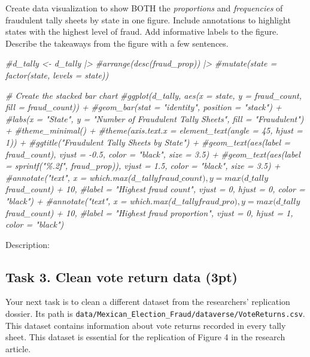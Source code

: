 \documentclass[
]{article}
\newenvironment{Shaded}{\begin{snugshade}}{\end{snugshade}}
\newcommand{\CommentTok}[1]{\textcolor[rgb]{0.56,0.35,0.01}{\textit{#1}}}
\begin{document}
Create data visualization to show BOTH the \emph{proportions} and
\emph{frequencies} of fraudulent tally sheets by state in one figure.
Include annotations to highlight states with the highest level of fraud.
Add informative labels to the figure. Describe the takeaways from the
figure with a few sentences.

\begin{Shaded}
\begin{Highlighting}[]
\CommentTok{\#d\_tally \textless{}{-} d\_tally |\textgreater{}}
  \CommentTok{\#arrange(desc(fraud\_prop)) |\textgreater{}}
  \CommentTok{\#mutate(state = factor(state, levels = state))}

\CommentTok{\# Create the stacked bar chart}
\CommentTok{\#ggplot(d\_tally, aes(x = state, y = fraud\_count, fill = fraud\_count)) +}
  \CommentTok{\#geom\_bar(stat = "identity", position = "stack") +}
  \CommentTok{\#labs(x = "State", y = "Number of Fraudulent Tally Sheets", fill = "Fraudulent") +}
  \CommentTok{\#theme\_minimal() +}
  \CommentTok{\#theme(axis.text.x = element\_text(angle = 45, hjust = 1)) +}
  \CommentTok{\#ggtitle("Fraudulent Tally Sheets by State") +}
  \CommentTok{\#geom\_text(aes(label = fraud\_count), vjust = {-}0.5, color = "black", size = 3.5) +}
  \CommentTok{\#geom\_text(aes(label = sprintf("\%.2f", fraud\_prop)), vjust = 1.5, color = "black", size = 3.5) +}
  \CommentTok{\#annotate("text", x = which.max(d\_tally$fraud\_count), y = max(d\_tally$fraud\_count) + 10, }
           \CommentTok{\#label = "Highest fraud count", vjust = 0, hjust = 0, color = "black") +}
  \CommentTok{\#annotate("text", x = which.max(d\_tally$fraud\_pro), y = max(d\_tally$fraud\_count) + 10, }
           \CommentTok{\#label = "Highest fraud proportion", vjust = 0, hjust = 1, color = "black")}
\end{Highlighting}
\end{Shaded}

Description:

\clearpage

\hypertarget{task-3.-clean-vote-return-data-3pt}{%
\subsection{Task 3. Clean vote return data
(3pt)}\label{task-3.-clean-vote-return-data-3pt}}

Your next task is to clean a different dataset from the researchers'
replication dossier. Its path is
\texttt{data/Mexican\_Election\_Fraud/dataverse/VoteReturns.csv}. This
dataset contains information about vote returns recorded in every tally
sheet. This dataset is essential for the replication of Figure 4 in the
research article.
\end{document}
